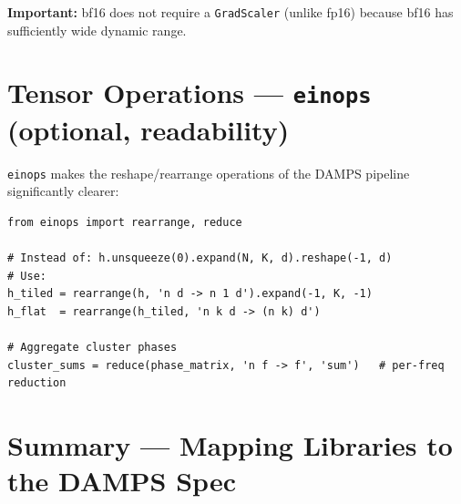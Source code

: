 \documentclass[11pt, a4paper]{article}
\begin{document}
\textbf{Important:} bf16 does not require a \texttt{GradScaler} (unlike fp16) because bf16 has sufficiently wide dynamic range.

\section{Tensor Operations --- \texttt{einops} (optional, readability)}

\texttt{einops} makes the reshape/rearrange operations of the DAMPS pipeline significantly clearer:

\begin{lstlisting}
from einops import rearrange, reduce

# Instead of: h.unsqueeze(0).expand(N, K, d).reshape(-1, d)
# Use:
h_tiled = rearrange(h, 'n d -> n 1 d').expand(-1, K, -1)
h_flat  = rearrange(h_tiled, 'n k d -> (n k) d')

# Aggregate cluster phases
cluster_sums = reduce(phase_matrix, 'n f -> f', 'sum')   # per-freq reduction
\end{lstlisting}

\section{Summary --- Mapping Libraries to the DAMPS Spec}
\end{document}

